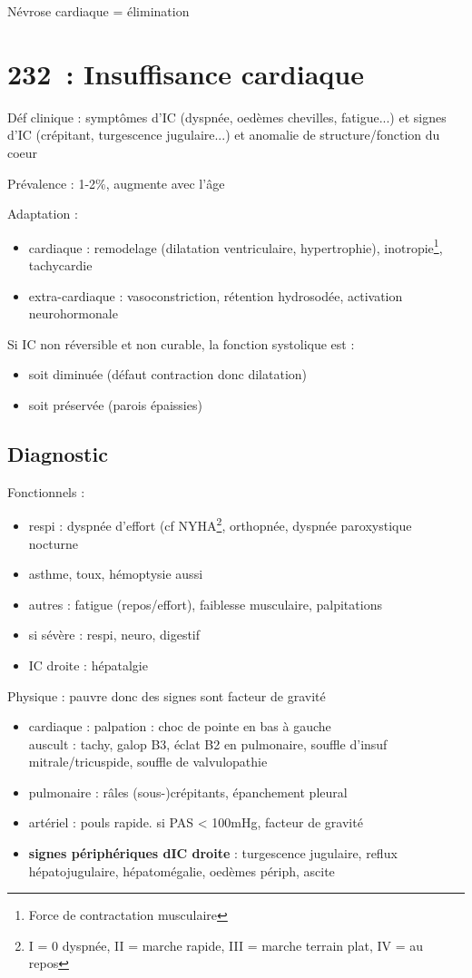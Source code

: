 Névrose cardiaque = élimination

\section{232 : Insuffisance cardiaque}%
\label{sec:insuffisance_cardiaque}
Déf clinique : symptômes d'\gls{IC} (dyspnée, oedèmes
chevilles, fatigue...) et signes d'IC (crépitant, turgescence jugulaire...)
et anomalie de structure/fonction du coeur

Prévalence : 1-2\%, augmente avec l'âge

Adaptation :
\begin{itemize}
  \item cardiaque : remodelage (dilatation ventriculaire, hypertrophie), \inc
    inotropie\footnote{Force de contractation musculaire}, tachycardie
  \item extra-cardiaque : vasoconstriction, rétention hydrosodée, activation
    neurohormonale
\end{itemize}
Si IC non réversible et non curable, la fonction systolique est :
\begin{itemize}
  \item soit diminuée (défaut contraction donc dilatation)
  \item soit préservée (parois épaissies)
\end{itemize}

\subsection{Diagnostic}
Fonctionnels :
\begin{itemize}
  \item respi : dyspnée d'effort (cf NYHA\footnote{I = 0 dyspnée, II = marche
      rapide, III = marche terrain plat, IV = au repos}, orthopnée, dyspnée paroxystique nocturne
  \item \danger{} asthme, toux, hémoptysie aussi 
  \item autres : fatigue (repos/effort), faiblesse musculaire, palpitations
  \item si sévère : respi, neuro, digestif
  \item IC droite : hépatalgie
\end{itemize}
Physique : pauvre donc des signes sont facteur de gravité
\begin{itemize}
  \item cardiaque : palpation : choc de pointe en bas à gauche\\
    auscult : tachy, galop B3, éclat B2 en pulmonaire, souffle d'insuf
    mitrale/tricuspide, souffle de valvulopathie
  \item pulmonaire : râles (sous-)crépitants, épanchement pleural
  \item artériel : pouls rapide. si PAS < 100mHg, facteur de gravité
  \item \textbf{signes périphériques dIC droite} : turgescence jugulaire, reflux
    hépatojugulaire, hépatomégalie, oedèmes périph, ascite
\end{itemize}

